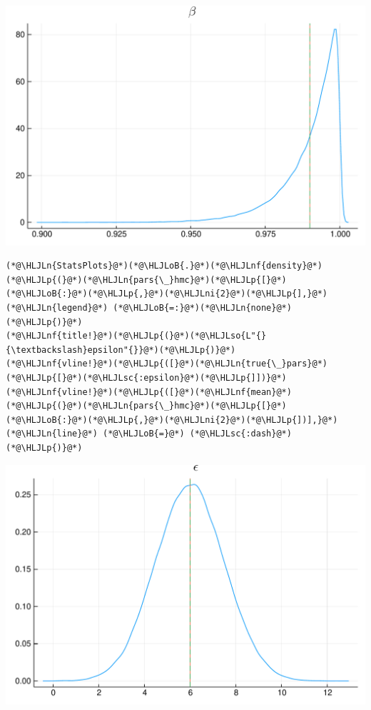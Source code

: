 \documentclass[12pt,a4paper]{article}
\newcommand{\HLJLn}[1]{#1}
\newcommand{\HLJLnf}[1]{\textcolor[RGB]{66,102,213}{#1}}
\newcommand{\HLJLsc}[1]{\textcolor[RGB]{201,61,57}{#1}}
\newcommand{\HLJLso}[1]{\textcolor[RGB]{201,61,57}{#1}}
\newcommand{\HLJLni}[1]{\textcolor[RGB]{59,151,46}{#1}}
\newcommand{\HLJLoB}[1]{\textcolor[RGB]{102,102,102}{\textbf{#1}}}
\newcommand{\HLJLp}[1]{#1}
\begin{document}
\includegraphics[width=\linewidth]{figures/dsge_and_julia_35_1.pdf}

\begin{lstlisting}
(*@\HLJLn{StatsPlots}@*)(*@\HLJLoB{.}@*)(*@\HLJLnf{density}@*)(*@\HLJLp{(}@*)(*@\HLJLn{pars{\_}hmc}@*)(*@\HLJLp{[}@*)(*@\HLJLoB{:}@*)(*@\HLJLp{,}@*)(*@\HLJLni{2}@*)(*@\HLJLp{],}@*) (*@\HLJLn{legend}@*) (*@\HLJLoB{=:}@*)(*@\HLJLn{none}@*)(*@\HLJLp{)}@*)
(*@\HLJLnf{title!}@*)(*@\HLJLp{(}@*)(*@\HLJLso{L"{}{\textbackslash}epsilon"{}}@*)(*@\HLJLp{)}@*)
(*@\HLJLnf{vline!}@*)(*@\HLJLp{([}@*)(*@\HLJLn{true{\_}pars}@*)(*@\HLJLp{[}@*)(*@\HLJLsc{:epsilon}@*)(*@\HLJLp{]])}@*)
(*@\HLJLnf{vline!}@*)(*@\HLJLp{([}@*)(*@\HLJLnf{mean}@*)(*@\HLJLp{(}@*)(*@\HLJLn{pars{\_}hmc}@*)(*@\HLJLp{[}@*)(*@\HLJLoB{:}@*)(*@\HLJLp{,}@*)(*@\HLJLni{2}@*)(*@\HLJLp{])],}@*) (*@\HLJLn{line}@*) (*@\HLJLoB{=}@*) (*@\HLJLsc{:dash}@*)(*@\HLJLp{)}@*)
\end{lstlisting}

\includegraphics[width=\linewidth]{figures/dsge_and_julia_36_1.pdf}
\end{document}
